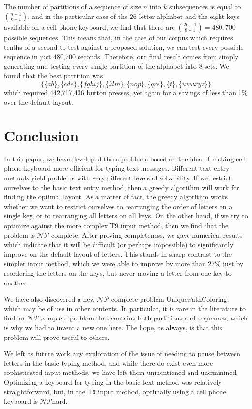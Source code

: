 \documentclass[runningheads]{llncs}
\newcommand{\NP}{\ensuremath{\mathcal{NP}}}
\begin{document}
The number of partitions of a sequence of size $n$ into $k$ subsequences is equal to $\binom{n-1}{k-1}$, and in the particular case of the 26 letter alphabet and the eight keys available on a cell phone keyboard, we find that there are $\binom{26-1}{8-1} = 480,700$ possible sequences.  This means that, in the case of our corpus which requires tenths of a second to test against a proposed solution, we can test every possible sequence in just 480,700 seconds.  Therefore, our final result comes from simply generating and testing every single partition of the alphabet into 8 sets.  We found that the best partition was 
$$\{\{ab\}, \{cde\}, \{fghij\}, \{klm\}, \{nop\}, \{qrs\}, \{t\}, \{uvwxyz\}\}$$
which required 442,717,436 button presses, yet again for a savings of less than 1\% over the default layout.

\section{Conclusion}

In this paper, we have developed three problems based on the idea of making cell phone keyboard more efficient for typing text messages.  Different text entry methods yield problems with very different levels of solvability.  If we restrict ourselves to the basic text entry method, then a greedy algorithm will work for finding the optimal layout.  As a matter of fact, the greedy algorithm works whether we want to restrict ourselves to rearranging the order of letters on a single key, or to rearranging all letters on all keys.  On the other hand, if we try to optimize against the more complex T9 input method, then we find that the problem is \NP-complete.  After proving completeness, we gave numerical results which indicate that it will be difficult (or perhaps impossible) to significantly improve on the default layout of letters.  This stands in sharp contrast to the simpler input method, which we were able to improve by more than 27\% just by reordering the letters on the keys, but never moving a letter from one key to another.

We have also discovered a new \NP-complete problem {\sc UniquePathColoring}, which may be of use in other contexts.  In particular, it is rare in the literature to find an \NP-complete problem that contains both partitions and sequences, which is why we had to invent a new one here.  The hope, as always, is that this problem will prove useful to others.

We left as future work any exploration of the issue of needing to pause between
letters in the basic typing method, and while there do exist even more
sophisticated input methods, we have left them unmentioned and unexamined.  Optimizing a keyboard for typing in the basic text method was relatively straightforward, but, in the T9 input method, optimally using a cell phone keyboard is \NP hard.



\end{document}
